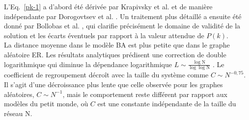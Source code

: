 L'Eq.~\eqref{pk-1} a d'abord été dérivée par Krapivsky et al. \cite{Krapivsky-al2000} et de manière indépendante par Dorogovtsev et al. \cite{Dorogovtsev-al2000-2}. Un traitement plus détaillé a ensuite été donné par Bollobas et al. \cite{Bollobas-Riordan2002}, qui clarifie précisément le domaine de validité de la solution et les écarts éventuels par rapport à la valeur attendue de  $P(k)$.\\ 

La distance moyenne dans le modèle BA est plus petite que dans le graphe aléatoire ER. Les résultats analytiques prédisent une correction de double logarithmique qui diminue la dépendance logarithmique $ L\sim\frac{\log \mathrm{N}}{\log\log\mathrm{N} }$ \cite{Bollobas-Riordan2002}. Le coefficient de regroupement décroît avec la taille du système comme $C\sim N^{-0,75}$. Il s'agit d'une décroissance plus lente que celle observée pour les graphes aléatoires, $C\sim N^{-1}$, mais le comportement reste différent par rapport aux modèles du petit monde, où $C$ est une constante indépendante de la taille du réseau $\mathrm{N}$.

